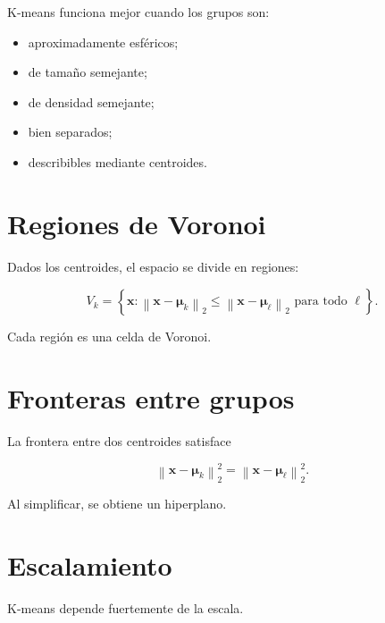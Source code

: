 \documentclass[
  spanish,
  10.5pt,
  letterpaper,
  DIV=11,
  numbers=noendperiod,
  oneside,
  open=any]{scrreprt}
\providecommand{\tightlist}{%
  \setlength{\itemsep}{0pt}\setlength{\parskip}{0pt}}
\theoremstyle{definition}
\theoremstyle{definition}
\theoremstyle{plain}
\theoremstyle{remark}
\begin{document}

K-means funciona mejor cuando los grupos son:

\begin{itemize}
\tightlist
\item
  aproximadamente esféricos;
\item
  de tamaño semejante;
\item
  de densidad semejante;
\item
  bien separados;
\item
  describibles mediante centroides.
\end{itemize}

\section*{Regiones de Voronoi}\label{regiones-de-voronoi}


Dados los centroides, el espacio se divide en regiones:

\[
V_k
=
\left\{
\mathbf{x}:
\left\|
\mathbf{x}-\boldsymbol{\mu}_k
\right\|_2
\leq
\left\|
\mathbf{x}-\boldsymbol{\mu}_\ell
\right\|_2
\text{ para todo }\ell
\right\}.
\]

Cada región es una celda de Voronoi.

\section*{Fronteras entre grupos}\label{fronteras-entre-grupos}


La frontera entre dos centroides satisface

\[
\left\|
\mathbf{x}-\boldsymbol{\mu}_k
\right\|_2^2
=
\left\|
\mathbf{x}-\boldsymbol{\mu}_\ell
\right\|_2^2.
\]

Al simplificar, se obtiene un hiperplano.

\section*{Escalamiento}\label{escalamiento-2}


K-means depende fuertemente de la escala.
\end{document}
